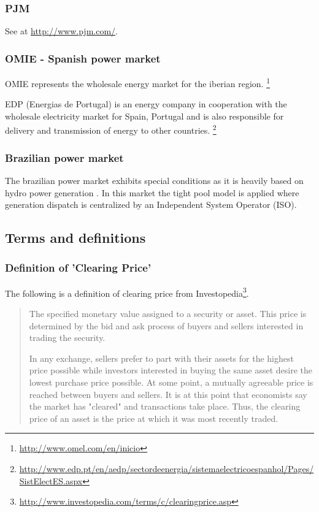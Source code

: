 \subsubsection{PJM}

See at \url{http://www.pjm.com/}. 


\subsubsection{OMIE - Spanish power market}

OMIE represents the wholesale energy market for the iberian region. \footnote{\url{http://www.omel.com/en/inicio}}

EDP (Energias de Portugal) is an energy company in cooperation with the wholesale electricity market for Spain, Portugal and is also responsible for delivery and transmission of energy to other countries. \footnote{\url{http://www.edp.pt/en/aedp/sectordeenergia/sistemaelectricoespanhol/Pages/SistElectES.aspx}}


\subsubsection{Brazilian power market}

The brazilian power market exhibits special conditions as it is heavily based on hydro power generation \cite{reston2012short}. In this market the tight pool model is applied where generation dispatch is centralized by an Independent System Operator (ISO). 



\subsection{Terms and definitions}

\subsubsection{Definition of 'Clearing Price'}

The following is a definition of clearing price from Investopedia\footnote{\url{http://www.investopedia.com/terms/c/clearingprice.asp}}. 

\begin{quote}
The specified monetary value assigned to a security or asset. This price is determined by the bid and ask process of buyers and sellers interested in trading the security.

In any exchange, sellers prefer to part with their assets for the highest price possible while investors interested in buying the same asset desire the lowest purchase price possible. At some point, a mutually agreeable price is reached between buyers and sellers. It is at this point that economists say the market has "cleared" and transactions take place. Thus, the clearing price of an asset is the price at which it was most recently traded.
\end{quote}



